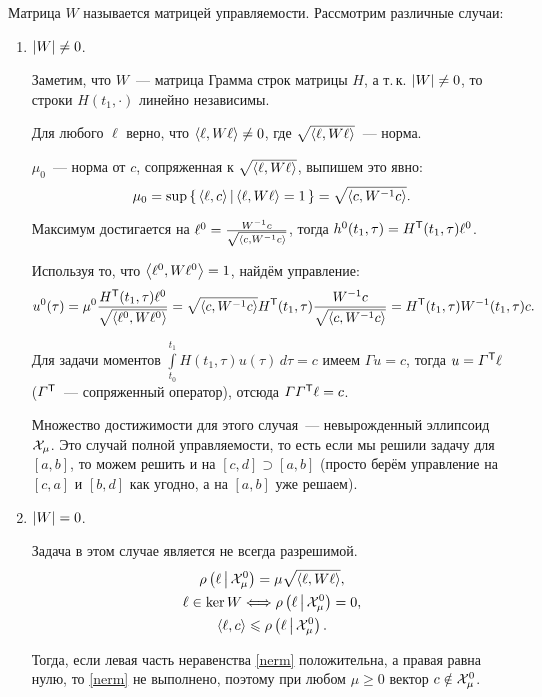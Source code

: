 Матрица $W$ называется матрицей управляемости.
Рассмотрим различные случаи:

\begin{enumerate}
	\item $\left| W \right| \neq 0$.

	Заметим, что $W$~--- матрица Грамма строк матрицы $H$, а т.\,к. $\left| W \right| \neq 0$,
	то строки $H(t_1, \cdot)$ линейно независимы.

	Для любого $\ell$ верно, что $\left<\ell,W \ell\right> \neq 0$,
	где $\sqrt{\left<\ell,W \ell\right>}$~--- норма.

	$\mu_0$~--- норма от $c$, сопряженная к $\sqrt{\left<\ell,W \ell\right>}$, выпишем это явно:
	\begin{equation*}
		\mu_0 = \sup \left\{\, \left<\ell,c\right> \,\middle|\, \left<\ell,W \ell\right> = 1 \,\right\} = \sqrt{\left<c,W^{-1} c\right>}.
	\end{equation*}

	Максимум достигается на
	$\ell^0 = \frac{W^{-1} c}{\sqrt{\left<c,W^{-1} c\right>}}$,
	тогда $h^0(t_1, \tau) = H^{\mathsf{T}}(t_1, \tau) \ell^0$.

	Используя то, что $\left<\ell^0,W \ell^0\right> = 1$, найдём управление:
	\begin{equation*}
		u^0(\tau) = \mu^0 \frac{H^{\mathsf{T}}(t_1, \tau) \ell^0}{\sqrt{\left<\ell^0,W \ell^0\right>}} =
		\sqrt{\left<c,W^{-1} c\right>} H^{\mathsf{T}}(t_1, \tau) \frac{W^{-1} c}{\sqrt{\left<c,W^{-1} c\right>}} =
		H^{\mathsf{T}}(t_1, \tau) W^{-1}(t_1, \tau) c.
	\end{equation*}

	Для задачи моментов $\displaystyle\int\limits_{t_0}^{t_1} H(t_1, \tau) u(\tau) \, d\tau = c$
	имеем $\varGamma u = c$, тогда $u = \varGamma^{\mathsf{T}} \ell$
	($\varGamma^{\mathsf{T}}$~--- сопряженный оператор), отсюда $\varGamma \varGamma^{\mathsf{T}} \ell = c$.

	Множество достижимости для этого случая~--- невырожденный эллипсоид $\mathcal{X}_\mu$.
	Это случай полной управляемости,
	то есть если мы решили задачу для $[a, b]$, то можем решить и на
	$[c, d] \supset [a, b]$ (просто берём управление на $[c, a]$ и $[b, d]$ как угодно,
	а на $[a, b]$ уже решаем).

	\item $\left| W \right| = 0$.

  Задача в этом случае является не всегда разрешимой.
  \begin{gather}
	  \notag \rho\left(\ell\,\middle|\,\mathcal{X}_\mu^0\right) = \mu \sqrt{\left<\ell,W \ell\right>},\\
	  \notag \ell \in \ker W \Longleftrightarrow \rho\left(\ell\,\middle|\,\mathcal{X}_\mu^0\right) = 0,\\
	  \left<\ell,c\right> \leqslant \rho\left(\ell\,\middle|\,\mathcal{X}_\mu^0\right) \label{nerm}.
  \end{gather}

  Тогда, если левая часть неравенства \eqref{nerm} положительна, а правая равна нулю,
  то \eqref{nerm} не выполнено, поэтому при любом $\mu \geqslant 0$ вектор
  $c \notin \mathcal{X}_\mu^0$.
\end{enumerate}


